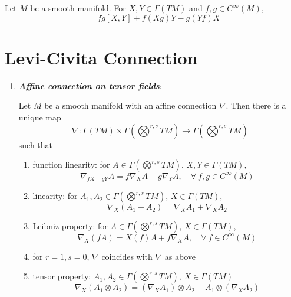 \begin{lem}\label{lem:liebracket}
	Let $M$ be a smooth manifold. For $X,Y \in \Gamma(TM)$ and $f,g \in C^\infty(M)$,
	\begin{equation*}
		[fX,gY] =fg[X,Y] + f(Xg)Y - g(Yf)X
	\end{equation*}
\end{lem}

\section{Levi-Civita Connection}

\begin{enumerate}[label=\arabic{*}.]
	\item \textbf{\emph{Affine connection on tensor fields}}:
		\begin{prop}
		Let $M$ be a smooth manifold with an affine connection $\nabla$. Then there is a unique map
		\begin{equation*}
			\nabla \colon \Gamma(TM)\times \Gamma(\bigotimes^{r,s}TM) \longrightarrow \Gamma(\bigotimes^{r,s}TM)
		\end{equation*}
		such that
		\begin{enumerate}[label=(\arabic{*})]
			\item function linearity: for $A \in \Gamma(\bigotimes^{r,s}TM)$, $X,Y\in \Gamma(TM)$,
			\begin{equation*}
				\nabla_{fX+gY}A = f\nabla_XA + g\nabla_YA,\quad \forall~f,g \in C^\infty(M)
			\end{equation*}
			\item linearity: for $A_1,A_2 \in \Gamma(\bigotimes^{r,s}TM)$, $X\in \Gamma(TM)$,
			\begin{equation*}
				\nabla_X(A_1+A_2) = \nabla_XA_1 + \nabla_XA_2
			\end{equation*}
			\item Leibniz property: for $A \in \Gamma(\bigotimes^{r,s}TM)$, $X\in \Gamma(TM)$,
			\begin{equation*}
				\nabla_X(fA) = X(f)A+f\nabla_XA,\quad \forall~f \in C^\infty(M)
			\end{equation*}
			\item for $r=1,s=0$, $\nabla$ coincides with $\nabla$ as above
			\item tensor property: $A_1,A_2 \in \Gamma(\bigotimes^{r,s}TM)$, $X\in \Gamma(TM)$
			\begin{equation*}
				\nabla_X(A_1 \otimes A_2) = (\nabla_XA_1)\otimes A_2 + A_1 \otimes (\nabla_XA_2)
			\end{equation*}

\end{enumerate}
\end{prop}
\end{enumerate}
